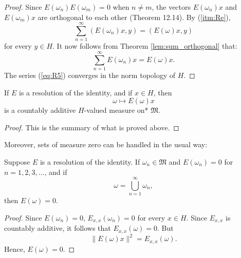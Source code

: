 \begin{proof}
  Since \( E(\omega_n)E(\omega_m) = 0 \) when \( n \neq m \), the vectors \( E(\omega_n)x \) and \( E(\omega_m)x \)
  are orthogonal to each other (Theorem 12.14).
  By (\ref{itm:Re}),
  \begin{equation}
    \label{eq:R5}
    \sum_{n=1}^{\infty} (E(\omega_n)x, y) = (E(\omega)x, y)
  \end{equation}
  for every \( y \in H \).
  It now follows from Theorem \ref{lem:sum_orthogonal} that:
  \[
    \sum_{n=1}^{\infty} E(\omega_n)x = E(\omega)x.
  \]
  The series (\eqref{eq:R5}) converges in the norm topology of \( H \).
\end{proof}

\begin{proposition}[Rudin 12.18]
  \label{thm:resId_vectorMeasure}
  If \( E \) is a resolution of the identity, and if \( x \in H \), then
  \[
    \omega \mapsto E(\omega)x
  \]
  is a countably additive \( H \)-valued measure on* \( \mathfrak{M} \).
\end{proposition}

\begin{proof}
  This is the summary of what is proved above.
\end{proof}

Moreover, sets of measure zero can be handled in the usual way:

\begin{proposition}[Rudin 12.19]
  \label{thm:resId_of_zero}
  Suppose \( E \) is a resolution of the identity.
  If \( \omega_n \in \mathfrak{M} \) and \( E(\omega_n) = 0 \) for \( n = 1,2,3,\dots \), and if
  \[
    \omega = \bigcup_{n=1}^{\infty} \omega_n,
  \]
  then \( E(\omega) = 0 \).
\end{proposition}

\begin{proof}
  Since \( E(\omega_n) = 0 \), \( E_{x,x}(\omega_n) = 0 \) for every \( x \in H \).
  Since \( E_{x,x} \) is countably additive, it follows that \( E_{x,x}(\omega) = 0 \).
  But
  \[
    \|E(\omega)x\|^2 = E_{x,x}(\omega).
  \]
  Hence, \( E(\omega) = 0 \).
\end{proof}



